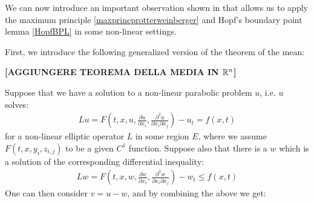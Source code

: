 We can now introduce an important observation shown in \cite{protterweinberger} that allows us to apply the maximum principle \ref{maxprincprotterweinberger} and Hopf's boundary point lemma \ref{HopfBPL} in some non-linear settings. 
\begin{comment}
	First, let's introduce an easier example from \cite{GidasNirenberg}: 
	Suppose that $u$ solves:
	\begin{align}
		u_t-L u+f(u)=0 \label{non-linear}
	\end{align}
	For an elliptic operator $L$, and where $u_t=\frac{\partial u}{\partial t}$. We note that this differs from the usual parabolic equation because here $f$ depends from the solution $u$, potentially in non-trivial ways, making the equation non-linear. 
	If a solution exists, and $f$ is a $C^1$ function, by the theorem of the mean, at any point $x$ in the domain of $u$ we can find a function $\xi(x)$ such that
	\begin{align*}
		f'(\xi(x))&=\frac{f(u(x))-f(0)}{u(x)-0}\\
		f'(\xi(x))u&=f(u(x))-f(0)
	\end{align*} 
	If $u$ solves (\ref{non-linear}), and if $f(0)\leq0$, then 
	\begin{align*}
		u_t-L u+f(u)-f(0) &\geq 0\\
		u_t-L u+ f'(\xi(x))u&\geq 0 \\
		u_t-L u+ c(x)u&\geq 0
	\end{align*}
	Hence the function $u$ is the super-solution to a (different) linear parabolic partial differential equation and hence we can apply the maximum principle \ref{maxprincprotterweinberger} and Hopf's boundary point lemma \ref{HopfBPL} to solutions of (\ref{non-linear}) as long as the other hypothesis apply to $c(x)$. 
\end{comment}
First, we introduce the following generalized version of the theorem of the mean:

{\vspace{10pt}\LARGE \bf [AGGIUNGERE TEOREMA DELLA MEDIA IN $\mathbb{R}^n$]}

Suppose that we have a solution to a non-linear parabolic problem $u$, i.e. $u$ solves:
\begin{align*}
	Lu= F\left(t, x, u, \frac{\partial u}{\partial x_i} , \frac{\partial^2 u}{\partial x_i \partial x_j}\right)-u_t = f(x, t)
\end{align*}
for a non-linear elliptic operator $L$ in some region $E$, where we assume $F(t, x, y_i, z_{i,j})$ to be a given $C^1$ function. Suppose also that there is a $w$ which is a solution of the corresponding differential inequality:
\begin{align*}
	Lw= F\left(t, x, w, \frac{\partial w}{\partial x_i} , \frac{\partial^2 w}{\partial x_i \partial x_j}\right)-w_t \leq f(x, t)
\end{align*}
One can then consider $v = u-w$, and by combining the above we get: 

